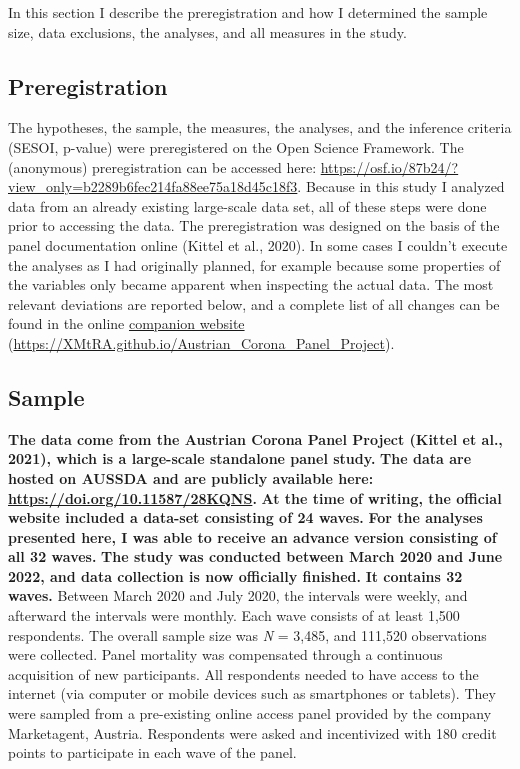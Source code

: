 \documentclass[
  man,mask]{apa7}
\begin{document}
In this section I describe the preregistration and how I determined the sample size, data exclusions, the analyses, and all measures in the study.

\hypertarget{preregistration}{%
\subsection{Preregistration}\label{preregistration}}

The hypotheses, the sample, the measures, the analyses, and the inference criteria (SESOI, p-value) were preregistered on the Open Science Framework.
The (anonymous) preregistration can be accessed here: \url{https://osf.io/87b24/?view_only=b2289b6fec214fa88ee75a18d45c18f3}.
Because in this study I analyzed data from an already existing large-scale data set, all of these steps were done prior to accessing the data.
The preregistration was designed on the basis of the panel documentation online (Kittel et al., 2020).
In some cases I couldn't execute the analyses as I had originally planned, for example because some properties of the variables only became apparent when inspecting the actual data.
The most relevant deviations are reported below, and a complete list of all changes can be found in the online \href{https://XMtRA.github.io/Austrian_Corona_Panel_Project}{companion website} (\url{https://XMtRA.github.io/Austrian_Corona_Panel_Project}).

\hypertarget{sample}{%
\subsection{Sample}\label{sample}}

\textbf{The data come from the Austrian Corona Panel Project (Kittel et al., 2021), which is a large-scale standalone panel study. }
\textbf{The data are hosted on AUSSDA and are publicly available here: \url{https://doi.org/10.11587/28KQNS}.}
\textbf{At the time of writing, the official website included a data-set consisting of 24 waves. }
\textbf{For the analyses presented here, I was able to receive an advance version consisting of all 32 waves.}
\textbf{The study was conducted between March 2020 and June 2022, and data collection is now officially finished.}
\textbf{It contains 32 waves.}
Between March 2020 and July 2020, the intervals were weekly, and afterward the intervals were monthly.
Each wave consists of at least 1,500 respondents.
The overall sample size was \emph{N} = 3,485, and 111,520 observations were collected.
Panel mortality was compensated through a continuous acquisition of new participants.
All respondents needed to have access to the internet (via computer or mobile devices such as smartphones or tablets).
They were sampled from a pre-existing online access panel provided by the company Marketagent, Austria.
Respondents were asked and incentivized with 180 credit points to participate in each wave of the panel.
\end{document}

